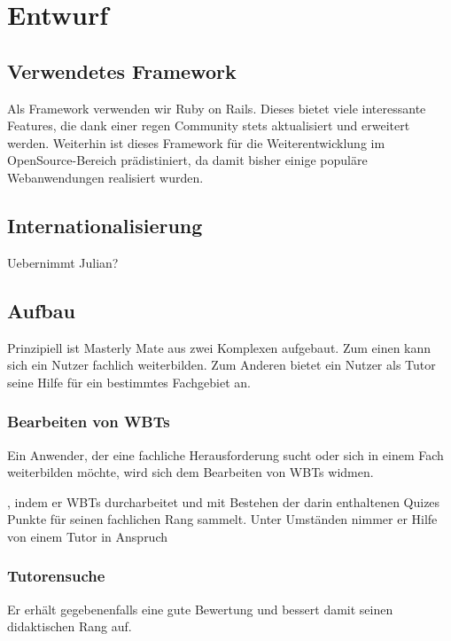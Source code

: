 \chapter{Entwurf}\label{ref:chaptScript}
\section{Verwendetes Framework}
Als Framework verwenden wir Ruby on Rails. Dieses bietet viele interessante
Features, die dank einer regen Community stets aktualisiert und erweitert
werden. Weiterhin ist dieses Framework für die Weiterentwicklung im
OpenSource-Bereich prädistiniert, da damit bisher einige populäre Webanwendungen
realisiert wurden.

\section{Internationalisierung}\label{ref:internationalisierung}
\begin{k}
Uebernimmt Julian?
\end{k}

\section{Aufbau}
Prinzipiell ist Masterly Mate aus zwei Komplexen aufgebaut. Zum einen kann sich
ein Nutzer fachlich weiterbilden. Zum Anderen bietet ein Nutzer als Tutor seine
Hilfe für ein bestimmtes Fachgebiet an.

\subsection{Bearbeiten von WBTs}
Ein Anwender, der eine fachliche Herausforderung sucht oder sich in einem Fach
weiterbilden möchte, wird sich dem Bearbeiten von WBTs widmen.

\begin{k}
, indem er WBTs durcharbeitet und mit Bestehen
der darin enthaltenen Quizes Punkte für seinen fachlichen Rang sammelt. Unter
Umständen nimmer er Hilfe von einem Tutor in Anspruch
\end{k}
\subsection{Tutorensuche}
\begin{k}
Er erhält gegebenenfalls eine gute Bewertung und
bessert damit seinen didaktischen Rang auf.
\end{k}